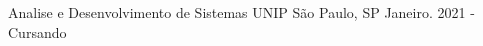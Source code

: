 

\begin{cventries}

\cventry
  {Analise e Desenvolvimento de Sistemas} %
  {UNIP} %
  {São Paulo, SP} %
  {Janeiro. 2021 - Cursando} %
  {
  }

\end{cventries}
